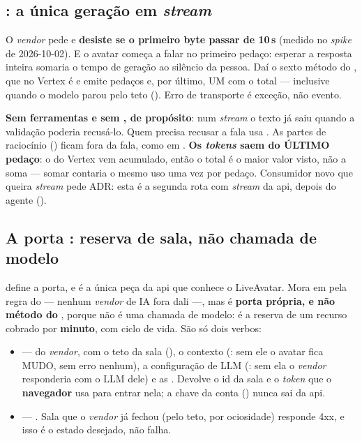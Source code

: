 \subsection{: a única geração em \emph{stream}}

O \emph{vendor} pede  e \textbf{desiste se o primeiro byte
passar de 10\,s} (medido no \emph{spike} de 2026-10-02). E o avatar começa a
falar no primeiro pedaço: esperar a resposta inteira somaria o tempo de geração
ao silêncio da pessoa. Daí o sexto método do , que no Vertex é
 e emite pedaços  e, por
último, UM  com o total --- inclusive quando o
modelo parou pelo teto (). Erro de transporte é exceção, não
evento.

\begin{regra}
\textbf{Sem ferramentas e sem , de propósito}: num \emph{stream} o
texto já saiu quando a validação poderia recusá-lo. Quem precisa recusar a fala
usa . As partes de raciocínio () ficam fora da
fala, como em . \textbf{Os \emph{tokens} saem do ÚLTIMO pedaço}: o
 do Vertex vem acumulado, então o total é o maior valor visto,
não a soma --- somar contaria o mesmo uso uma vez por pedaço. Consumidor novo
que queira \emph{stream} pede ADR: esta é a segunda rota com \emph{stream} da
api, depois do agente ().
\end{regra}

\subsection{A porta : reserva de sala, não chamada de modelo}

 define a porta, e
 é a única peça da api que conhece o LiveAvatar.
Mora em  pela regra do  --- nenhum \emph{vendor} de IA
fora dali ---, mas é \textbf{porta própria, e não método do },
porque não é uma chamada de modelo: é a reserva de um recurso cobrado por
\textbf{minuto}, com ciclo de vida. São só dois verbos:

\begin{itemize}
  \item {} ---  do \emph{vendor},
    com o teto da sala (), o contexto
    (: sem ele o avatar fica MUDO, sem erro nenhum), a
    configuração de LLM (: sem ela o \emph{vendor}
    responderia com o LLM dele) e as . Devolve o id da
    sala e o \emph{token} que o \textbf{navegador} usa para entrar nela; a chave
    da conta () nunca sai da api.
  \item {} --- . Sala que o
    \emph{vendor} já fechou (pelo teto, por ociosidade) responde 4xx, e isso é o
    estado desejado, não falha.
\end{itemize}


